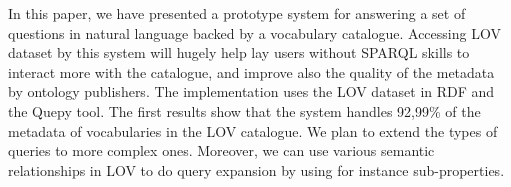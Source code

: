 \documentclass[runningheads,a4paper]{llncs}
\newcommand{\todo}[1]{\noindent\textcolor{red}{{\bf \{TODO}: #1{\bf \}}}}
\begin{document}
In this paper, we have presented a prototype system for answering a set of questions in natural language backed by a vocabulary catalogue. Accessing LOV dataset by this system will hugely help lay users without SPARQL skills to interact more with the catalogue, and improve also the quality of the metadata by ontology publishers.  
The implementation uses the LOV dataset in RDF and the Quepy tool. The first results show that the system handles 92,99\% of the metadata of vocabularies in the LOV catalogue.
We plan to extend the types of queries to more complex ones. Moreover, we can use various semantic relationships in LOV to do query expansion by using for instance sub-properties. 






\end{document}

